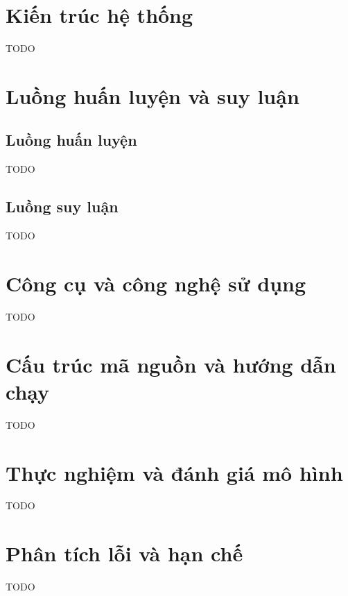 \documentclass[12pt]{ai_conquer2026}
\begin{document}
\section{Kiến trúc hệ thống}
TODO

\section{Luồng huấn luyện và suy luận}
\subsection{Luồng huấn luyện}
TODO
\subsection{Luồng suy luận}
TODO

\section{Công cụ và công nghệ sử dụng}
TODO

\section{Cấu trúc mã nguồn và hướng dẫn chạy}
TODO

\section{Thực nghiệm và đánh giá mô hình}
TODO

\section{Phân tích lỗi và hạn chế}
TODO
\end{document}
